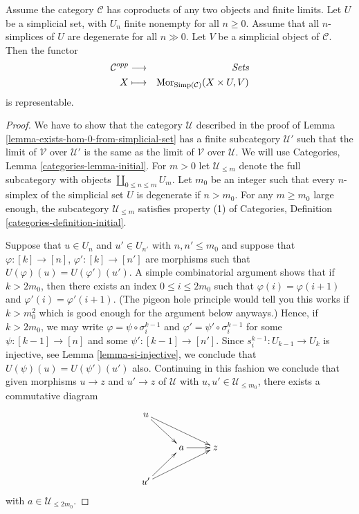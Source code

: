\begin{lemma}
\label{lemma-exists-hom-0-from-simplicial-set-finite}
Assume the category $\mathcal{C}$
has coproducts of any two objects and finite
limits. Let $U$ be a simplicial set, with $U_n$ finite nonempty
for all $n \geq 0$. Assume that all $n$-simplices
of $U$ are degenerate for all $n \gg 0$.
Let $V$ be a simplicial object of $\mathcal{C}$.
Then the functor
\begin{eqnarray*}
\mathcal{C}^{opp} & \longrightarrow & \textit{Sets} \\
X
& \longmapsto &
\mathop{\mathrm{Mor}}\nolimits_{\text{Simp}(\mathcal{C})}(X \times U, V)
\end{eqnarray*}
is representable.
\end{lemma}

\begin{proof}
We have to show that the category $\mathcal{U}$ described
in the proof of Lemma \ref{lemma-exists-hom-0-from-simplicial-set}
has a finite subcategory $\mathcal{U}'$ such that the limit
of $\mathcal{V}$ over $\mathcal{U}'$ is the same as the
limit of $\mathcal{V}$ over $\mathcal{U}$. We will use
Categories, Lemma \ref{categories-lemma-initial}.
For $m > 0$ let $\mathcal{U}_{\leq m}$ denote the full
subcategory with objects $\coprod_{0 \leq n \leq m} U_m$.
Let $m_0$ be an integer such that every $n$-simplex
of the simplicial set $U$ is degenerate if $n > m_0$.
For any $m \geq m_0$ large enough, the subcategory
$\mathcal{U}_{\leq m}$ satisfies property (1) of
Categories, Definition \ref{categories-definition-initial}.

\medskip\noindent
Suppose that $u \in U_n$ and
$u' \in U_{n'}$ with $n, n' \leq m_0$ and suppose that
$\varphi : [k] \to [n]$, $\varphi' : [k] \to [n']$
are morphisms such that $U(\varphi)(u) = U(\varphi')(u')$.
A simple combinatorial argument shows that if $k > 2m_0$,
then there exists an index $0 \leq i \leq 2m_0$ such that
$\varphi(i) =\varphi(i + 1)$ and $\varphi'(i) = \varphi'(i + 1)$.
(The pigeon hole principle would tell you this works if
$k > m_0^2$ which is good enough for the argument below
anyways.) Hence, if $k > 2m_0$, we may write
$\varphi = \psi \circ \sigma^{k - 1}_i$ and
$\varphi' = \psi' \circ \sigma^{k - 1}_i$ for some
$\psi : [k - 1] \to [n]$ and some $\psi' : [k - 1] \to [n']$.
Since $s^{k - 1}_i : U_{k - 1} \to U_k$ is injective,
see Lemma \ref{lemma-si-injective}, we conclude that
$U(\psi)(u) = U(\psi')(u')$ also. Continuing in this
fashion we conclude that given morphisms
$u \to z$ and $u' \to z$ of $\mathcal{U}$
with $u, u' \in \mathcal{U}_{\leq m_0}$, there exists
a commutative diagram
$$
\xymatrix{
u \ar[rd] \ar[rrd] & & \\
& a \ar[r] & z \\
u' \ar[ru] \ar[rru]
}
$$
with $a \in \mathcal{U}_{\leq 2m_0}$.


\end{proof}
